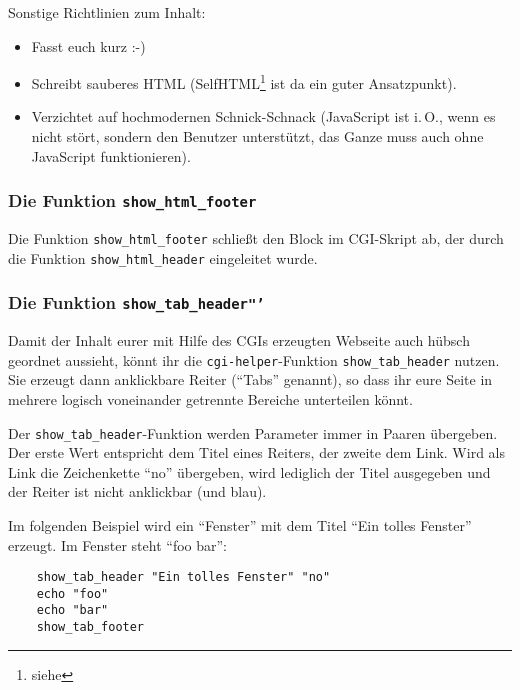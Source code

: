 Sonstige Richtlinien zum Inhalt:

\begin{itemize}
 \item Fasst euch kurz :-)
 \item Schreibt sauberes HTML (SelfHTML\footnote{siehe
    } ist da ein guter Ansatzpunkt).
 \item Verzichtet auf hochmodernen Schnick-Schnack (JavaScript ist i.\,O., wenn
    es nicht stört, sondern den Benutzer unterstützt, das Ganze muss auch ohne
    JavaScript funktionieren).
\end{itemize}

\subsubsection{Die Funktion \texttt{show\_html\_footer}}

Die Funktion \texttt{show\_html\_footer} schließt den Block im CGI-Skript ab,
der durch die Funktion \texttt{show\_html\_header} eingeleitet wurde.

\subsubsection{Die Funktion \texttt{show\_tab\_header"'}}

Damit der Inhalt eurer mit Hilfe des CGIs erzeugten Webseite auch hübsch
geordnet aussieht, könnt ihr die \texttt{cgi-helper}-Funktion
\texttt{show\_tab\_header} nutzen. Sie erzeugt dann anklickbare Reiter ("`Tabs"'
genannt), so dass ihr eure Seite in mehrere logisch voneinander getrennte
Bereiche unterteilen könnt.

Der \texttt{show\_tab\_header}-Funktion werden Parameter immer in Paaren
übergeben. Der erste Wert entspricht dem Titel eines Reiters, der zweite dem
Link. Wird als Link die Zeichenkette "`no"' übergeben, wird lediglich der Titel
ausgegeben und der Reiter ist nicht anklickbar (und blau).

Im folgenden Beispiel wird ein "`Fenster"' mit dem Titel "`Ein tolles Fenster"'
erzeugt. Im Fenster steht "`foo bar"':

\begin{example}
\begin{verbatim}
    show_tab_header "Ein tolles Fenster" "no"
    echo "foo"
    echo "bar"
    show_tab_footer
\end{verbatim}
\end{example}

